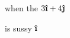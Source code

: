 \documentclass{article}
\newcommand{\uveci}{{\bm{\hat{\textnormal{\bfseries\i}}}}}
\newcommand{\uvecj}{{\bm{\hat{\textnormal{\bfseries\j}}}}}
\begin{document}
\begin{multicols}{2}
    when the 
    \(3 \uveci + 4 \uvecj\)
    \lipsum[3]

    is sussy \(\uveci\)
\end{multicols}


\end{document}
